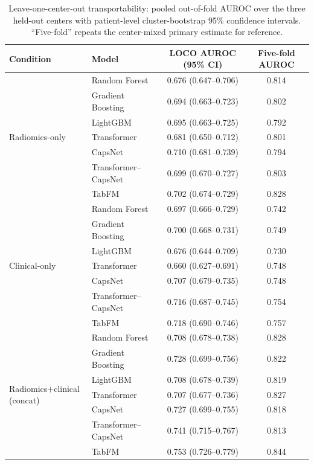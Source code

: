 \documentclass[11pt]{article}
\begin{document}
\begin{table}[htbp]
\centering
\caption{Leave-one-center-out transportability: pooled out-of-fold AUROC over the
three held-out centers with patient-level cluster-bootstrap 95\% confidence
intervals. ``Five-fold'' repeats the center-mixed primary estimate for reference.}
\label{tab:loco_full}
\begin{tabular}{llcc}
\toprule
Condition & Model & LOCO AUROC (95\% CI) & Five-fold AUROC \\
\midrule
\multirow{7}{*}{Radiomics-only}
 & Random Forest        & 0.676 (0.647--0.706) & 0.814 \\
 & Gradient Boosting    & 0.694 (0.663--0.723) & 0.802 \\
 & LightGBM             & 0.695 (0.663--0.725) & 0.792 \\
 & Transformer          & 0.681 (0.650--0.712) & 0.801 \\
 & CapsNet              & 0.710 (0.681--0.739) & 0.794 \\
 & Transformer--CapsNet & 0.699 (0.670--0.727) & 0.803 \\
 & TabFM                & 0.702 (0.674--0.729) & 0.828 \\
\midrule
\multirow{7}{*}{Clinical-only}
 & Random Forest        & 0.697 (0.666--0.729) & 0.742 \\
 & Gradient Boosting    & 0.700 (0.668--0.731) & 0.749 \\
 & LightGBM             & 0.676 (0.644--0.709) & 0.730 \\
 & Transformer          & 0.660 (0.627--0.691) & 0.748 \\
 & CapsNet              & 0.707 (0.679--0.735) & 0.748 \\
 & Transformer--CapsNet & 0.716 (0.687--0.745) & 0.754 \\
 & TabFM                & 0.718 (0.690--0.746) & 0.757 \\
\midrule
\multirow{7}{*}{Radiomics$+$clinical (concat)}
 & Random Forest        & 0.708 (0.678--0.738) & 0.828 \\
 & Gradient Boosting    & 0.728 (0.699--0.756) & 0.822 \\
 & LightGBM             & 0.708 (0.678--0.739) & 0.819 \\
 & Transformer          & 0.707 (0.677--0.736) & 0.827 \\
 & CapsNet              & 0.727 (0.699--0.755) & 0.818 \\
 & Transformer--CapsNet & 0.741 (0.715--0.767) & 0.813 \\
 & TabFM                & 0.753 (0.726--0.779) & 0.844 \\
\bottomrule
\end{tabular}
\end{table}
\end{document}
